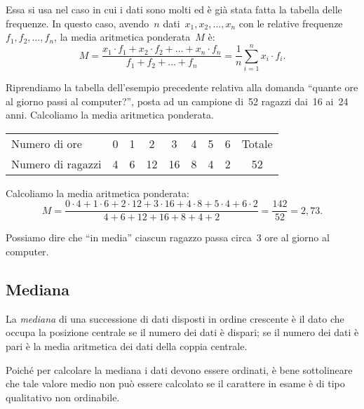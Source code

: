 Essa si usa nel caso in cui i dati sono molti ed è già stata fatta la 
tabella delle frequenze. In questo caso,
avendo~$n$ dati~$x_1, x_2, \ldots, x_n$ con le relative frequenze~$f_1, 
f_2, \ldots, f_n$, la media aritmetica ponderata~$M$ è:
\begin{equation*}
M=\frac{x_1\cdot f_1+x_2\cdot f_2+ \dots +x_n\cdot f_n}{f_1+f_2+ \dots 
+f_n}=\frac{1}{n}\sum_{i=1}^n x_i\cdot f_i.
\end{equation*}
\begin{exrig}
 \begin{esempio}

Riprendiamo la tabella dell'esempio precedente relativa alla domanda 
``quante ore al giorno passi al computer?'',
posta ad un campione di~52 ragazzi dai~16 ai~24 anni. Calcoliamo la media 
aritmetica ponderata.

\begin{center}
 \begin{tabular}{lcccccccc}
 \toprule
 Numero di ore & 0 & 1 & 2 & 3 & 4 & 5 & 6 & Totale\\
 Numero di ragazzi & 4 & 6 & 12 & 16 & 8 & 4 & 2 & 52\\
 \bottomrule
\end{tabular}
\end{center}

Calcoliamo la media aritmetica ponderata:
\begin{equation*}
M=\frac{0\cdot 4+1\cdot 6+2\cdot 12+3\cdot 16+4\cdot 8+5\cdot 4+6\cdot 
2}{4+6+12+16+8+4+2}=\frac{142}{52}=2,73.
\end{equation*}

Possiamo dire che ``in media'' ciascun ragazzo passa circa~3 ore al giorno 
al computer.
\end{esempio}
\end{exrig}

\subsection{Mediana}
\begin{definizione}
La \emph{mediana} di una successione di dati disposti in ordine crescente è 
il dato che occupa la
posizione centrale se il numero dei dati è dispari; se il numero dei dati è 
pari è la media aritmetica dei dati della coppia centrale.
\end{definizione}

Poiché per calcolare la mediana i dati devono essere ordinati, è bene 
sottolineare che tale valore medio non può essere calcolato se il carattere
in esame è di tipo qualitativo non ordinabile.

